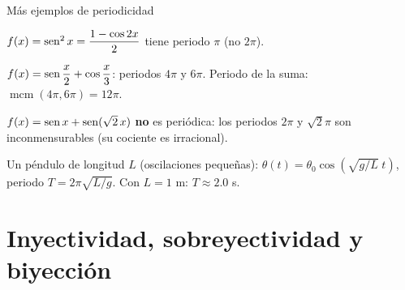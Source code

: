 \documentclass[10pt,aspectratio=169]{beamer}
\begin{document}
\begin{frame}{Más ejemplos de periodicidad}
  \begin{ejemplo}[5]
    $f(x)=\operatorname{sen}^2x=\dfrac{1-\cos2x}{2}$ tiene periodo $\pi$ (no $2\pi$).
  \end{ejemplo}
  \begin{ejemplo}
    $f(x)=\operatorname{sen}\dfrac{x}{2}+\cos\dfrac{x}{3}$: periodos $4\pi$ y $6\pi$. Periodo de la suma: $\operatorname{mcm}(4\pi,6\pi)=12\pi$.
  \end{ejemplo}
  \begin{ejemplo}
    $f(x)=\operatorname{sen} x+\operatorname{sen}(\sqrt2\,x)$ \textbf{no} es periódica: los periodos $2\pi$ y $\sqrt2\pi$ son inconmensurables (su cociente es irracional).
  \end{ejemplo}
  \begin{ejemplo}[8: física]
    Un péndulo de longitud $L$ (oscilaciones pequeñas): $\theta(t)=\theta_0\cos\left(\sqrt{g/L}\;t\right)$, periodo $T=2\pi\sqrt{L/g}$.
    Con $L=1$ m: $T\approx2.0$ s.
  \end{ejemplo}
\end{frame}

\section{Inyectividad, sobreyectividad y biyección}
\end{document}
